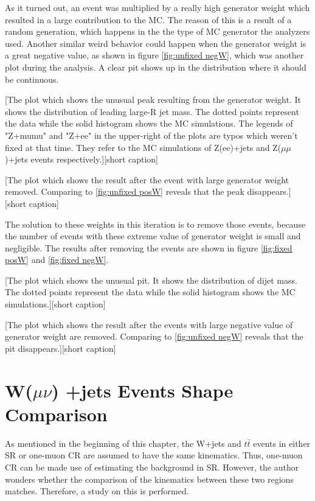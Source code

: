 \documentclass[class=NCU_thesis, crop=false]{standalone}
\begin{document}
		As it turned out, an event was multiplied by a really high generator weight which resulted in a large contribution to the MC. The reason of this is a result of a random generation, which happens in the the type of MC generator the analyzers used. Another similar weird behavior could happen when the generator weight is a great negative value, as shown in figure \ref{fig:unfixed negW}, which was another plot during the analysis. A clear pit shows up in the distribution where it should be continuous.
		
		[The plot which shows the unusual peak resulting from the generator weight. It shows the distribution of leading large-R jet mass. The dotted points represent the data while the solid histogram shows the MC simulations. The legends of "Z+mumu" and "Z+ee" in the upper-right of the plots are typos which weren't fixed at that time. They refer to the MC simulations of Z(ee)+jets and Z($\mu \mu$)+jets events respectively.][short caption]
		
		[The plot which shows the result after the event with large generator weight removed. Comparing to \ref{fig:unfixed posW} reveals that the peak disappears.][short caption]
		
		The solution to these weights in this iteration is to remove those events, because the number of events with these extreme value of generator weight is small and negligible. The results after removing the events are shown in figure \ref{fig:fixed posW} and \ref{fig:fixed negW}.
		
		[The plot which shows the unusual pit. It shows the distribution of dijet mass. The dotted points represent the data while the solid histogram shows the MC simulations.][short caption]
		
		[The plot which shows the result after the events with large negative value of generator weight are removed. Comparing to \ref{fig:unfixed negW} reveals that the pit disappears.][short caption]
	
	\section{W($\mu \nu$) +jets Events Shape Comparison}
		As mentioned in the beginning of this chapter, the W+jets and $t\bar{t}$ events in either SR or one-muon CR are assumed to have the same kinematics. Thus, one-muon CR can be made use of estimating the background in SR. However, the author wonders whether the comparison of the kinematics between these two regions matches. Therefore, a study on this is performed.
	
\end{document}
